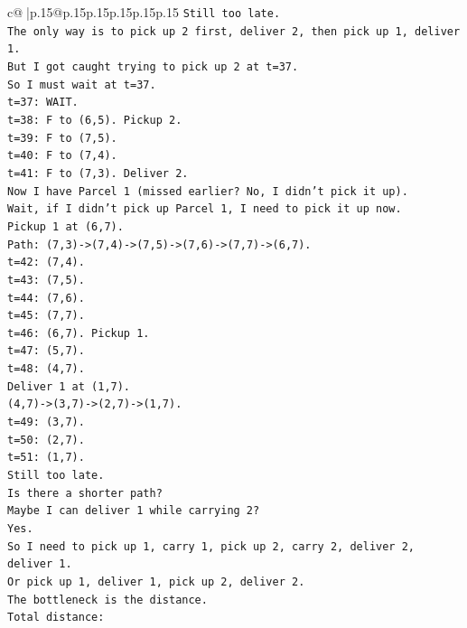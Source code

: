 \documentclass{article}
\begin{document}
{\begin{supertabular}{c@{$\;$}|p{.15\linewidth}@{}p{.15\linewidth}p{.15\linewidth}p{.15\linewidth}p{.15\linewidth}p{.15\linewidth}}
{{{\texttt{Still too late.} \\
\texttt{The only way is to pick up 2 first, deliver 2, then pick up 1, deliver 1.} \\
\texttt{But I got caught trying to pick up 2 at t=37.} \\
\texttt{So I must wait at t=37.} \\
\texttt{t=37: WAIT.} \\
\texttt{t=38: F to (6,5). Pickup 2.} \\
\texttt{t=39: F to (7,5).} \\
\texttt{t=40: F to (7,4).} \\
\texttt{t=41: F to (7,3). Deliver 2.} \\
\texttt{Now I have Parcel 1 (missed earlier? No, I didn't pick it up).} \\
\texttt{Wait, if I didn't pick up Parcel 1, I need to pick it up now.} \\
\texttt{Pickup 1 at (6,7).} \\
\texttt{Path: (7,3){-}>(7,4){-}>(7,5){-}>(7,6){-}>(7,7){-}>(6,7).} \\
\texttt{t=42: (7,4).} \\
\texttt{t=43: (7,5).} \\
\texttt{t=44: (7,6).} \\
\texttt{t=45: (7,7).} \\
\texttt{t=46: (6,7). Pickup 1.} \\
\texttt{t=47: (5,7).} \\
\texttt{t=48: (4,7).} \\
\texttt{Deliver 1 at (1,7).} \\
\texttt{(4,7){-}>(3,7){-}>(2,7){-}>(1,7).} \\
\texttt{t=49: (3,7).} \\
\texttt{t=50: (2,7).} \\
\texttt{t=51: (1,7).} \\
\texttt{Still too late.} \\
\texttt{Is there a shorter path?} \\
\texttt{Maybe I can deliver 1 while carrying 2?} \\
\texttt{Yes.} \\
\texttt{So I need to pick up 1, carry 1, pick up 2, carry 2, deliver 2, deliver 1.} \\
\texttt{Or pick up 1, deliver 1, pick up 2, deliver 2.} \\
\texttt{The bottleneck is the distance.} \\
\texttt{Total distance:} \\
}}}
\end{supertabular}}
\end{document}
